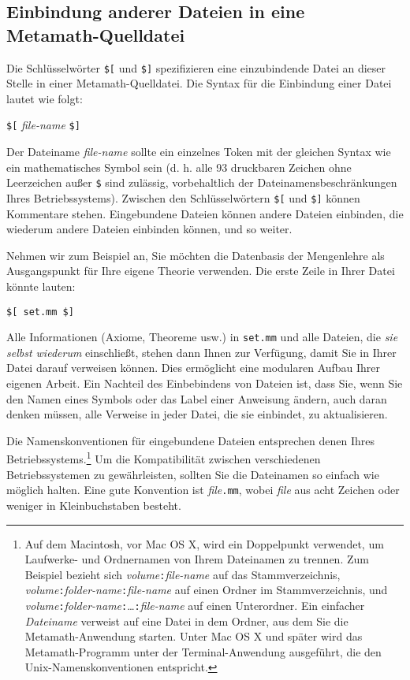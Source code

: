 \subsection{Einbindung anderer Dateien in eine Metamath-Quelldatei} \label{include}

Die Schlüsselwörter \texttt{\$[} und \texttt{\$]} spezifizieren eine einzubindende Datei an dieser Stelle in einer Metamath-Quelldatei.  Die Syntax für die Einbindung einer Datei lautet wie folgt:
\begin{center}
\texttt{\$[} {\em file-name} \texttt{\$]}
\end{center}

Der Dateiname {\em file-name} sollte ein einzelnes Token mit der gleichen Syntax wie ein mathematisches Symbol sein (d. h. alle 93 druckbaren Zeichen ohne Leerzeichen außer \texttt{\$} sind zulässig, vorbehaltlich der Dateinamensbeschränkungen Ihres Betriebssystems). Zwischen den Schlüsselwörtern \texttt{\$[} und \texttt{\$]} können Kommentare stehen.  Eingebundene Dateien können andere Dateien einbinden, die wiederum andere Dateien einbinden können, und so weiter.

Nehmen wir zum Beispiel an, Sie möchten die Datenbasis der Mengenlehre als Ausgangspunkt für Ihre eigene Theorie verwenden.  Die erste Zeile in Ihrer Datei könnte lauten:
\begin{center}
  \texttt{\$[ set.mm \$]}
\end{center}
Alle Informationen (Axiome, Theoreme usw.) in \texttt{set.mm} und alle Dateien, die {\em sie selbst wiederum} einschließt, stehen dann Ihnen zur Verfügung, damit Sie in Ihrer Datei darauf verweisen können. Dies ermöglicht eine modularen Aufbau Ihrer eigenen Arbeit. Ein Nachteil des Einbebindens von Dateien ist, dass Sie, wenn Sie den Namen eines Symbols oder das Label einer Anweisung ändern, auch daran denken müssen, alle Verweise in jeder Datei, die sie einbindet, zu aktualisieren.

Die Namenskonventionen für eingebundene Dateien entsprechen denen Ihres Betriebssystems.\footnote{Auf dem Macintosh, vor Mac OS X, wird ein Doppelpunkt verwendet, um Laufwerke- und Ordnernamen von Ihrem Dateinamen zu trennen.  Zum Beispiel bezieht sich {\em volume}\texttt{:}{\em file-name} auf das Stammverzeichnis, {\em volume}\texttt{:}{\em folder-name}\texttt{:}{\em file-name} auf einen Ordner im Stammverzeichnis, und {\em volume}\texttt{:}{\em folder-name}\texttt{:}\ldots\texttt{:}{\em file-name} auf einen Unterordner.  Ein einfacher {\em Dateiname} verweist auf eine Datei in dem Ordner, aus dem Sie die Metamath-Anwendung starten.  Unter Mac OS X und später wird das Metamath-Programm unter der Terminal-Anwendung ausgeführt, die den Unix-Namenskonventionen entspricht.}\label{includef} Um die Kompatibilität zwischen verschiedenen Betriebssystemen zu gewährleisten, sollten Sie die Dateinamen so einfach wie möglich halten.  Eine gute Konvention ist {\em file}\texttt{.mm}, wobei {\em file} aus acht Zeichen oder weniger in Kleinbuchstaben besteht.

